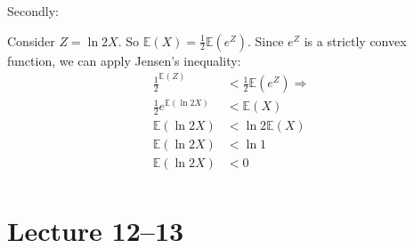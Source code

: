 \documentclass[10pt,\jkfside,a4paper]{article}
\begin{document}
\begin{enumerate}
Secondly:

Consider $Z = \ln 2X$. So $\mathbb{E}(X) = \frac{1}{2}\mathbb{E}(e^{Z})$. Since $e^Z$ is a strictly convex
function, we can apply Jensen's inequality:
\[
\begin{split}
\frac{1}{2}^{\mathbb{E}(Z)} &< \frac{1}{2}\mathbb{E}(e^Z) \Longrightarrow \\
\frac{1}{2}e^{\mathbb{E}(\ln 2X)} &< \mathbb{E}(X) \\
\mathbb{E}(\ln 2X) &< \ln 2\mathbb{E}(X) \\
\mathbb{E}(\ln 2X) &< \ln 1 \\
\mathbb{E}(\ln 2X) &< 0 \\
\end{split}
\]

\end{enumerate}

\section*{Lecture 12--13}
\end{document}
